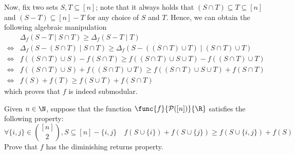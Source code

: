 \documentclass[a4paper, 12pt]{report}
\begin{document}
{        Now, fix two sets $S, T \subseteq [n]$; note that it always holds that $(S \cap T) \subseteq T \subseteq [n]$ and $(S - T) \subseteq [n] - T$ for any choice of $S$ and $T$. Hence, we can obtain the following algebraic manipulation
        \begin{equation*}
            \begin{split}
                     & \Delta_f(S - T \mid S \cap T) \ge \Delta_f(S - T \mid T) \\
                \iff & \Delta_f(S - (S \cap T) \mid S \cap T) \ge \Delta_f(S - ((S \cap T) \cup T) \mid (S \cap T) \cup T) \\
                \iff & f((S \cap T) \cup S) - f(S \cap T) \ge f((S \cap T) \cup S \cup T) - f((S \cap T) \cup T) \\
                \iff & f((S \cap T) \cup S) + f((S \cap T) \cup T) \ge f((S \cap T) \cup S \cup T) + f(S \cap T) \\
                \iff & f(S) + f(T) \ge f(S \cup T) + f(S \cap T)
            \end{split}
        \end{equation*}
        which proves that $f$ is indeed submodular.
    }

    \begin{framedprob}{}
        Given $n \in \N$, suppose that the function $\func{f}{\mathcal P([n])}{\R}$ satisfies the following property: $$\forall \{i, j\} \in \binom{[n]}{2}, S \subseteq [n] - \{i, j\} \quad f(S \cup \{i\}) + f(S \cup \{j\}) \ge f(S \cup \{i, j \}) + f(S)$$ Prove that $f$ has the diminishing returns property.
    \end{framedprob}
\end{document}
